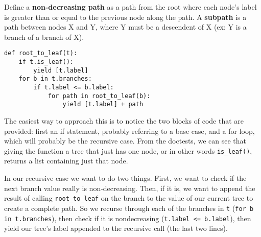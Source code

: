 \question
Define a \textbf{non-decreasing path} as a path from the root where each node's label is greater than or equal to the previous node along the path. A \textbf{subpath} is a path between nodes X and Y, where Y must be a descendent of X (ex: Y is a branch of a branch of X).
\begin{parts}

\begin{solution}
\begin{lstlisting}
def root_to_leaf(t):
    if t.is_leaf():
        yield [t.label]
    for b in t.branches:
        if t.label <= b.label:
            for path in root_to_leaf(b):
                yield [t.label] + path
\end{lstlisting}

The easiest way to approach this is to notice the two blocks of code that are provided: first an if statement, probably referring to a base case, and a for loop, which will probably be the recursive case. From the doctests, we can see that giving the function a tree that just has one node, or in other words \lstinline{is_leaf()}, returns a list containing just that node.

In our recursive case we want to do two things. First, we want to check if the next branch value really is non-decreasing. Then, if it is, we want to append the result of calling \lstinline{root_to_leaf} on the branch to the value of our current tree to create a complete path. So we recurse through each of the branches in \lstinline{t} (\lstinline{for b in t.branches}), then check if it is nondecreasing (\lstinline{t.label <= b.label}), then yield our tree’s label appended to the recursive call (the last two lines).
\end{solution}


\end{parts}
